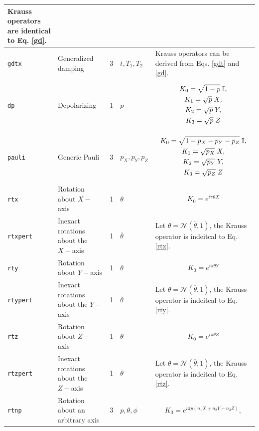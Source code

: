 \documentclass[11pt]{article}
\def\cN{\mathcal{N}}
\def\bI{\mathbb{I}}
\begin{document}
\begin{longtable}{|p{1.2cm}|p{2.5cm}|p{1cm}|p{2cm}|p{8cm}|}
Krauss operators are identical to Eq. \ref{gd}. \\
\hline
\texttt{gdtx} & Generalized damping & 3 & $t, T_{1}, T_{2}$ & Krauss operators can be derived from Eqs. \ref{gdt} and \ref{gd}. \\
\hline
\texttt{dp} & Depolarizing & 1 & $p$ &
\parbox{5cm}{\begin{gather*}
K_{0} = \sqrt{1-p}\thickspace \bI, \\
K_{1} = \sqrt{p}\thickspace X, \\
K_{2} = \sqrt{p}\thickspace Y, \\
K_{3} = \sqrt{p}\thickspace Z
\end{gather*}} \\
\hline
\texttt{pauli} & Generic Pauli & 3 & $p_{X}, p_{Y}, p_{Z}$ &
\parbox{5cm}{\begin{gather*}
K_{0} = \sqrt{1-p_{X} - p_{Y} - p_{Z}}\thickspace \bI, \\
K_{1} = \sqrt{p_{X}}\thickspace X, \\
K_{2} = \sqrt{p_{Y}}\thickspace Y, \\
K_{3} = \sqrt{p_{Z}}\thickspace Z
\end{gather*}} \\
\hline
\texttt{rtx} & Rotation about $X-$axis & 1 & $\theta$ &
\parbox{5cm}{\begin{gather}
K_{0} = e^{i \pi \theta X} \label{rtx}
\end{gather}} \\
\hline
\texttt{rtxpert} & Inexact rotations about the $X-$axis & 1 & $\overline{\theta}$ & Let $\theta = \cN(\overline{\theta}, 1)$, the Krauss operator is indeitcal to Eq. \ref{rtx}. \\
\hline
\texttt{rty} & Rotation about $Y-$axis & 1 & $\theta$ &
\parbox{5cm}{\begin{gather}
K_{0} = e^{i \pi \theta Y} \label{rty}
\end{gather}} \\
\hline
\texttt{rtypert} & Inexact rotations about the $Y-$axis & 1 & $\overline{\theta}$ & Let $\theta = \cN(\overline{\theta}, 1)$, the Krauss operator is indeitcal to Eq. \ref{rty}. \\
\hline
\texttt{rtz} & Rotation about $Z-$axis & 1 & $\theta$ &
\parbox{5cm}{\begin{gather}
K_{0} = e^{i \pi \theta Z} \label{rtz}
\end{gather}} \\
\hline
\texttt{rtzpert} & Inexact rotations about the $Z-$axis & 1 & $\overline{\theta}$ & Let $\theta = \cN(\overline{\theta}, 1)$, the Krauss operator is indeitcal to Eq. \ref{rtz}. \\
\hline
\texttt{rtnp} & Rotation about an arbitrary axis & 3 & $p, \theta, \phi$ &
\parbox{5cm}{\begin{gather*}
K_{0} = e^{i \pi p (n_{1} X + n_{2} Y + n_{3} Z)},
\end{gather*}}


\end{longtable}
\end{document}
